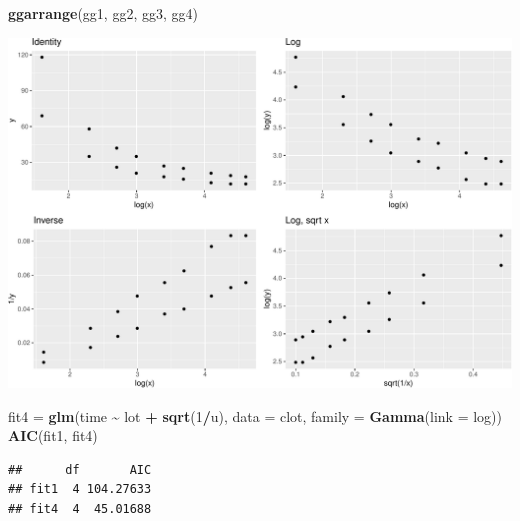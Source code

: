 \documentclass[
  ignorenonframetext,
]{beamer}
\newenvironment{Shaded}{\begin{snugshade}}{\end{snugshade}}
\newcommand{\AttributeTok}[1]{\textcolor[rgb]{0.13,0.29,0.53}{#1}}
\newcommand{\DecValTok}[1]{\textcolor[rgb]{0.00,0.00,0.81}{#1}}
\newcommand{\FunctionTok}[1]{\textcolor[rgb]{0.13,0.29,0.53}{\textbf{#1}}}
\newcommand{\NormalTok}[1]{#1}
\newcommand{\OtherTok}[1]{\textcolor[rgb]{0.56,0.35,0.01}{#1}}
\newcommand{\SpecialCharTok}[1]{\textcolor[rgb]{0.81,0.36,0.00}{\textbf{#1}}}
\begin{document}
\begin{frame}[fragile]
\begin{Shaded}
\begin{Highlighting}[]
\FunctionTok{ggarrange}\NormalTok{(gg1, gg2, gg3, gg4)}
\end{Highlighting}
\end{Shaded}

\includegraphics{Module04PoissonGammaPresentationWeek2_files/figure-beamer/unnamed-chunk-22-1.pdf}
\end{frame}

\begin{frame}[fragile]
\begin{Shaded}
\begin{Highlighting}[]
\NormalTok{fit4 }\OtherTok{=} \FunctionTok{glm}\NormalTok{(time }\SpecialCharTok{\textasciitilde{}}\NormalTok{ lot }\SpecialCharTok{+} \FunctionTok{sqrt}\NormalTok{(}\DecValTok{1}\SpecialCharTok{/}\NormalTok{u), }\AttributeTok{data =}\NormalTok{ clot, }\AttributeTok{family =} \FunctionTok{Gamma}\NormalTok{(}\AttributeTok{link =}\NormalTok{ log))}
\FunctionTok{AIC}\NormalTok{(fit1, fit4)}
\end{Highlighting}
\end{Shaded}

\begin{verbatim}
##      df       AIC
## fit1  4 104.27633
## fit4  4  45.01688
\end{verbatim}
\end{frame}
\end{document}
